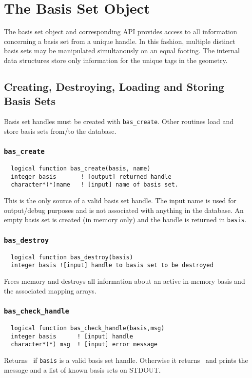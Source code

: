 \section{The Basis Set Object}
\label{sec:basis}

The basis set object and corresponding API provides access to all
information concerning a basis set from a unique handle.  In this
fashion, multiple distinct basis sets may be manipulated simultanously
on an equal footing.  The internal data structures store only
information for the unique tags in the geometry.

\subsection{Creating, Destroying, Loading and Storing Basis Sets}

Basis set handles must be created with \verb+bas_create+.  Other
routines load and store basis sets from/to the database.

\subsubsection{{\tt bas\_create}}
\begin{verbatim}
  logical function bas_create(basis, name)
  integer basis       ! [output] returned handle
  character*(*)name   ! [input] name of basis set.  
\end{verbatim}
This is the only source of a valid basis set handle.  The input name
is used for output/debug purposes and is not associated with anything
in the database.  An empty basis set is created (in memory only) and
the handle is returned in {\tt basis}.

\subsubsection{{\tt bas\_destroy}}
\begin{verbatim}
  logical function bas_destroy(basis)
  integer basis ![input] handle to basis set to be destroyed
\end{verbatim}
Frees memory and destroys all information about an active in-memory basis
and the associated mapping arrays.

\subsubsection{{\tt bas\_check\_handle}}
\begin{verbatim}
  logical function bas_check_handle(basis,msg)
  integer basis      ! [input] handle
  character*(*) msg  ! [input] error message
\end{verbatim}
Returns \TRUE\ if {\tt basis} is a valid basis set handle.  Otherwise
it returns \FALSE\ and prints the message and a list of known basis
sets on STDOUT.

